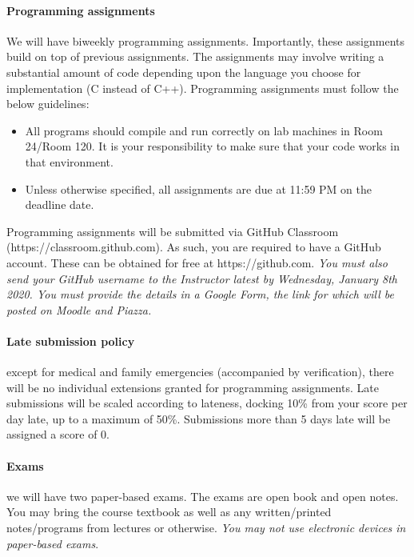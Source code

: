 \documentclass{article}
\begin{document}
\paragraph{Programming assignments} 
We will have biweekly programming assignments. 
Importantly, these assignments build on top of previous assignments. 
The assignments may involve writing a substantial amount of code depending upon the language you choose for implementation (C instead of C++). 
Programming assignments must follow the below guidelines:
\begin{itemize}
\item All programs should compile and run correctly on lab machines in Room 24/Room 120. It is your responsibility to make sure that your code works in that environment.
\item Unless otherwise specified, all assignments are due at 11:59 PM on the deadline date.
\end{itemize}

Programming assignments will be submitted via GitHub Classroom (https://classroom.github.com). As such, you are required to have a GitHub account. These can be obtained for free at https://github.com.
{\em You must also send your GitHub username to the Instructor latest by Wednesday, January 8th 2020. You must provide the details in a Google Form, the link for which will be posted on Moodle and Piazza. }

\paragraph{Late submission policy} except for medical and family emergencies (accompanied by verification), there will be no individual extensions granted for programming assignments. Late submissions will be scaled according to lateness, docking 10\% from your score per day late, up to a maximum of 50\%. Submissions more than 5 days late will be assigned a score of 0.

\paragraph{Exams} we will have two paper-based exams. 
The exams are open book and open notes. 
You may bring the course textbook as well as any written/printed notes/programs from lectures or otherwise. 
{\em You may not use electronic devices in paper-based exams}.
\end{document}
